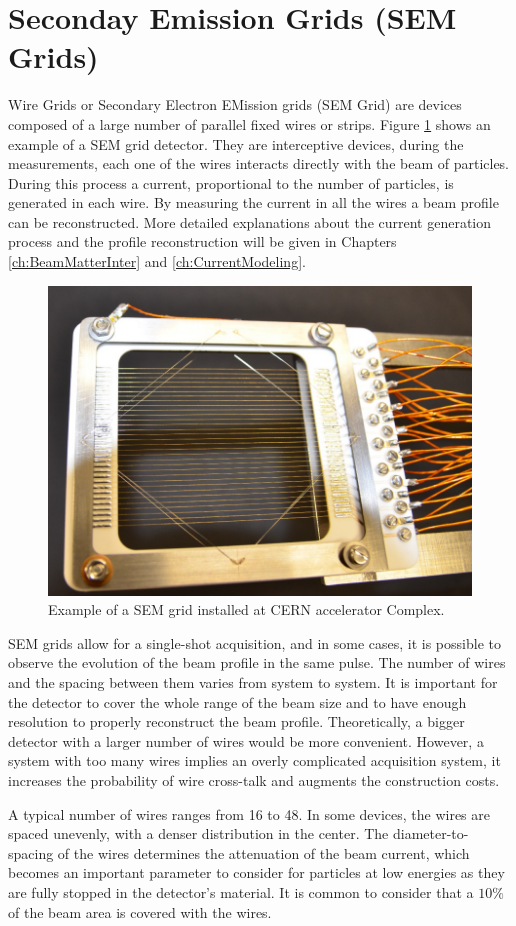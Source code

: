 \section{Seconday Emission Grids (SEM Grids)}
\label{sec:SEMgrids}

Wire Grids or Secondary Electron EMission grids (SEM Grid) are devices composed of a large number of parallel fixed wires or strips. Figure \ref{fig:SEMgrid} shows an example of a SEM grid detector. They are interceptive devices, during the measurements, each one of the wires interacts directly with the beam of particles. During this process a current, proportional to the number of particles, is generated in each wire.  By measuring the current in all the wires a beam profile can be reconstructed. More detailed explanations about the current generation process and the profile reconstruction will be given in Chapters \ref{ch:BeamMatterInter} and \ref{ch:CurrentModeling}.

\begin{figure}[h]
    \centering
    \includegraphics[width=0.6\columnwidth]{SEMGrid/semgrid.png}
    \caption{Example of a SEM grid installed at CERN accelerator Complex. }
    \label{fig:SEMgrid}
\end{figure}

SEM grids allow for a single-shot acquisition, and in some cases, it is possible to observe the evolution of the beam profile in the same pulse. The number of wires and the spacing between them varies from system to system. It is important for the detector to cover the whole range of the beam size and to have enough resolution to properly reconstruct the beam profile. Theoretically, a bigger detector with a larger number of wires would be more convenient. However, a system with too many wires implies an overly complicated acquisition system, it increases the probability of wire cross-talk and augments the construction costs. 

A typical number of wires ranges from 16 to 48. In some devices, the wires are spaced unevenly, with a denser distribution in the center. The diameter-to-spacing of the wires determines the attenuation of the beam current, which becomes an important parameter to consider for particles at low energies as they are fully stopped in the detector's material. It is common to consider that a $10 \%$ of the beam area is covered with the wires. 

